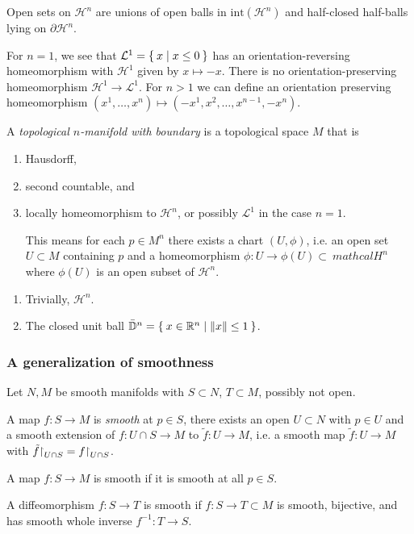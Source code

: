 Open sets on $\mathcal{H}^n$ are unions of open balls in
$\mathrm{int}(\mathcal{H}^n)$ and half-closed half-balls lying on
$\partial \mathcal{H}^n$.

For $n = 1$, we see that
$\mathcal{L}^1 = \Set{ x | x \leq 0 }$ has an
orientation-reversing homeomorphism with $\mathcal{H}^1$
given by $x \mapsto -x$. There is no orientation-preserving
homeomorphism $\mathcal{H}^1 \to \mathcal{L}^1$. For
$n > 1$ we can define an orientation preserving homeomorphism
$(x^1, \dots, x^n) \mapsto (-x^1, x^2, \dots, x^{n-1}, -x^n)$.

\begin{defn}
A \emph{topological $n$-manifold with boundary} is a topological
space $M$ that is
\begin{enumerate}
  \item{
    Hausdorff,
  }
  \item{
    second countable, and
  }
  \item{
    locally homeomorphism to $\mathcal{H}^n$, or possibly
    $\mathcal{L}^1$ in the case $n = 1$.

    This means for each $p \in M^n$ there exists a chart
    $(U, \phi)$, i.e. an open set $U \subset M$ containing $p$ and a
    homeomorphism $\phi: U \to \phi(U) \subset\ mathcal{H}^n$ where
    $\phi(U)$ is an open subset of $\mathcal{H}^n$.
  }
\end{enumerate}
\end{defn}

\begin{xmpl}
  \begin{enumerate}
    \item{
      Trivially, $\mathcal{H}^n$.
    }
    \item{
      The closed unit ball
      $\bar{\mathbb{D}}^n = \Set{ x \in \mathbb{R}^n | \|x\| \leq 1 }$.
    }
  \end{enumerate}
\end{xmpl}

\subsubsection{A generalization of smoothness}
Let $N, M$ be smooth manifolds with $S \subset N$,
$T \subset M$, possibly not open.

\begin{defn}
A map $f : S \to M$ is \emph{smooth} at $p \in S$, there
exists an open $U \subset N$ with $p \in U$ and a smooth extension of
$f: U \cap S \to M$ to $\tilde{f}: U \to M$, i.e. a smooth map
$\tilde{f}: U \to M$ with $\tilde{f}\mathord{\upharpoonright}_{U \cap S} =
f\mathord{\upharpoonright}_{U \cap S}$.

A map $f : S \to M$ is smooth if it is smooth
at all $p \in S$.

A diffeomorphism $f: S \to T$ is smooth if
$f: S \to T \subset M$ is smooth, bijective, and has smooth whole
inverse $f^{-1}: T \to S$.
\end{defn}


